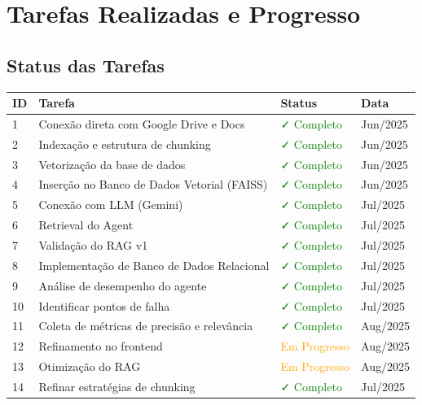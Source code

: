 \documentclass[12pt,a4paper]{report}
\begin{document}
\newpage

\chapter{Tarefas Realizadas e Progresso}

\section{Status das Tarefas}

\begin{longtable}{|p{2cm}|p{6cm}|p{2cm}|p{2cm}|}
\hline
\textbf{ID} & \textbf{Tarefa} & \textbf{Status} & \textbf{Data} \\
\hline
\endhead

1 & Conexão direta com Google Drive e Docs & \textcolor{green}{✓ Completo} & Jun/2025 \\
\hline
2 & Indexação e estrutura de chunking & \textcolor{green}{✓ Completo} & Jun/2025 \\
\hline
3 & Vetorização da base de dados & \textcolor{green}{✓ Completo} & Jun/2025 \\
\hline
4 & Inserção no Banco de Dados Vetorial (FAISS) & \textcolor{green}{✓ Completo} & Jun/2025 \\
\hline
5 & Conexão com LLM (Gemini) & \textcolor{green}{✓ Completo} & Jul/2025 \\
\hline
6 & Retrieval do Agent & \textcolor{green}{✓ Completo} & Jul/2025 \\
\hline
7 & Validação do RAG v1 & \textcolor{green}{✓ Completo} & Jul/2025 \\
\hline
8 & Implementação de Banco de Dados Relacional & \textcolor{green}{✓ Completo} & Jul/2025 \\
\hline
9 & Análise de desempenho do agente & \textcolor{green}{✓ Completo} & Jul/2025 \\
\hline
10 & Identificar pontos de falha & \textcolor{green}{✓ Completo} & Jul/2025 \\
\hline
11 & Coleta de métricas de precisão e relevância & \textcolor{green}{✓ Completo} & Aug/2025 \\
\hline
12 & Refinamento no frontend & \textcolor{orange}{Em Progresso} & Aug/2025 \\
\hline
13 & Otimização do RAG & \textcolor{orange}{Em Progresso} & Aug/2025 \\
\hline
14 & Refinar estratégias de chunking & \textcolor{green}{✓ Completo} & Jul/2025 \\

\end{longtable}
\end{document}
